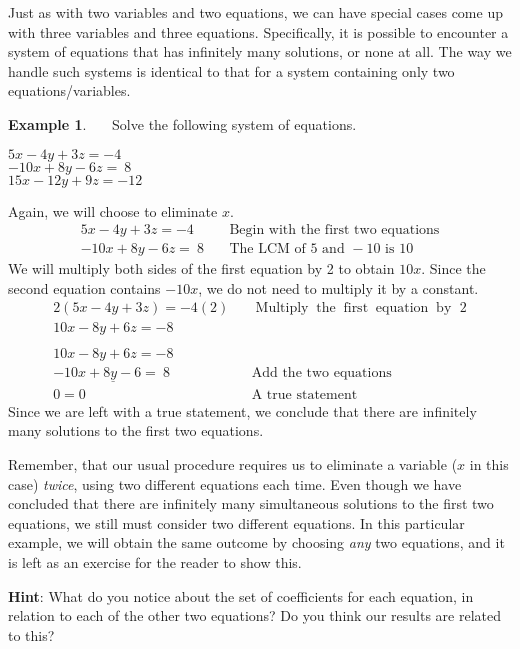 \documentclass[12pt]{book}
\theoremstyle{definition}
\newtheorem{example}{Example}
\newcommand{\tmop}[1]{\ensuremath{\operatorname{#1}}}
\begin{document}
Just as with two variables and two equations, we can have special cases come up with three variables and three equations. Specifically, it is possible to encounter a system of equations that has infinitely many solutions, or none at all.  The way we handle such systems is identical to that for a system containing only two equations/variables.
\begin{example}~~~Solve the following system of equations.
\begin{center}
		$5 x - 4 y + 3 z = - 4$\\
		$- 10 x + 8 y - 6 z = ~8~~~~$\\
		$15 x - 12 y + 9 z = - 12$
\end{center}
Again, we will choose to eliminate $x$.
	\begin{eqnarray*}
    5 x - 4 y + 3 z = - 4 &  & \text{Begin~with~the~first~two~equations}\\
		- 10 x + 8 y - 6 z = ~8~& & \text{The~LCM~of~} 5 \text{~and~} -10 \text{~is~} 10%
	\end{eqnarray*}
We will multiply both sides of the first equation by 2 to obtain $10x$.  Since the second equation contains $-10x$, we do not need to multiply it by a constant.
	\begin{eqnarray*}
    2 (5 x - 4 y + 3 z) = - 4 (2) &  & \tmop{Multiply} \tmop{the} \tmop{first}
    \tmop{equation} \tmop{by~} 2\\
    10 x - 8 y + 6 z = - 8~~~~ &  & \\
    &  & \\
    10 x - 8 y + 6 z = - 8 &  & \\
    \underline{- 10 x + 8 y - 6 = ~8~} &  & \text{Add~the~two~equations}\\
    0 = 0~~ &  & \tmop{A~true~statement}
  \end{eqnarray*}
Since we are left with a true statement, we conclude that there are infinitely many solutions to the first two equations.
\end{example}
Remember, that our usual procedure requires us to eliminate a variable ($x$ in this case) {\it twice}, using two different equations each time.  Even though we have concluded that there are infinitely many simultaneous solutions to the first two equations, we still must consider two different equations.  In this particular example, we will obtain the same outcome by choosing {\it any} two equations, and it is left as an exercise for the reader to show this.\par
{\bf Hint}: What do you notice about the set of coefficients for each equation, in relation to each of the other two equations?  Do you think our results are related to this?\par
\end{document}
